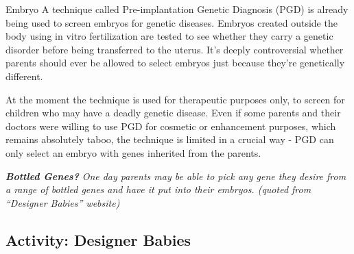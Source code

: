 \documentclass[
]{book}
\begin{document}
Embryo A technique called Pre-implantation Genetic Diagnosis (PGD) is already being used to screen embryos for genetic diseases. Embryos created outside the body using in vitro fertilization are tested to see whether they carry a genetic disorder before being transferred to the uterus. It's deeply controversial whether parents should ever be allowed to select embryos just because they're genetically different.

At the moment the technique is used for therapeutic purposes only, to screen for children who may have a deadly genetic disease. Even if some parents and their doctors were willing to use PGD for cosmetic or enhancement purposes, which remains absolutely taboo, the technique is limited in a crucial way - PGD can only select an embryo with genes inherited from the parents.

\textbf{\emph{Bottled Genes?}} \emph{One day parents may be able to pick any gene they desire from a range of bottled genes and have it put into their embryos. (quoted from ``Designer Babies'' website)}

\hypertarget{activity-designer-babies}{%
\subsection*{Activity: Designer Babies}\label{activity-designer-babies}}
\end{document}
